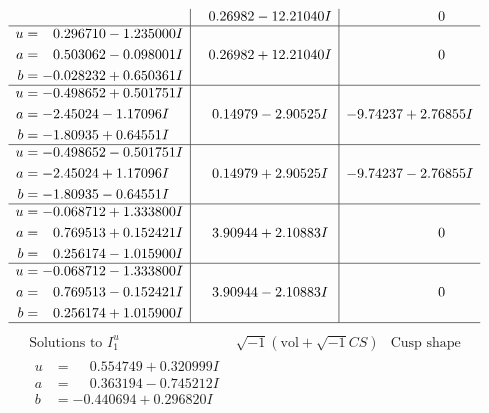 \documentclass[1p]{elsarticle_modified}
\theoremstyle{definition}
\newcommand{\I}{\sqrt{-1}}
\begin{document}
$$\begin{array}{c|c|c}
 & \phantom{-}0.26982 - 12.21040 I & \phantom{-0.000000 } 0 \\ \hline\begin{aligned}
u &= \phantom{-}0.296710 - 1.235000 I \\
a &= \phantom{-}0.503062 - 0.098001 I \\
b &= -0.028232 + 0.650361 I\end{aligned}
 & \phantom{-}0.26982 + 12.21040 I & \phantom{-0.000000 } 0 \\ \hline\begin{aligned}
u &= -0.498652 + 0.501751 I \\
a &= -2.45024 - 1.17096 I \\
b &= -1.80935 + 0.64551 I\end{aligned}
 & \phantom{-}0.14979 - 2.90525 I & -9.74237 + 2.76855 I \\ \hline\begin{aligned}
u &= -0.498652 - 0.501751 I \\
a &= -2.45024 + 1.17096 I \\
b &= -1.80935 - 0.64551 I\end{aligned}
 & \phantom{-}0.14979 + 2.90525 I & -9.74237 - 2.76855 I \\ \hline\begin{aligned}
u &= -0.068712 + 1.333800 I \\
a &= \phantom{-}0.769513 + 0.152421 I \\
b &= \phantom{-}0.256174 - 1.015900 I\end{aligned}
 & \phantom{-}3.90944 + 2.10883 I & \phantom{-0.000000 } 0 \\ \hline\begin{aligned}
u &= -0.068712 - 1.333800 I \\
a &= \phantom{-}0.769513 - 0.152421 I \\
b &= \phantom{-}0.256174 + 1.015900 I\end{aligned}
 & \phantom{-}3.90944 - 2.10883 I & \phantom{-0.000000 } 0\\
 \hline 
 \end{array}$$\newpage$$\begin{array}{c|c|c}  
\text{Solutions to }I^u_{1}& \I (\text{vol} + \sqrt{-1}CS) & \text{Cusp shape}\\
 \hline 
\begin{aligned}
u &= \phantom{-}0.554749 + 0.320999 I \\
a &= \phantom{-}0.363194 - 0.745212 I \\
b &= -0.440694 + 0.296820 I\end{aligned}

\end{array}$$
\end{document}
